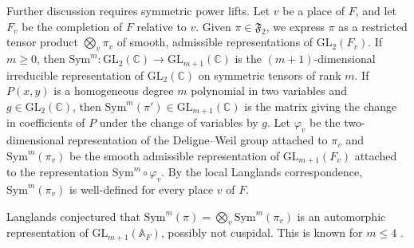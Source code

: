 \documentclass[11pt]{amsart}
\theoremstyle{remark}
\numberwithin{equation}{section}
\begin{document}
Further discussion requires symmetric power lifts.  Let $v$ be a place of $F$, and let $F_v$ be the completion of $F$ relative to $v$.  Given $\pi\in\mathfrak{F}_{2}$, we express $\pi$ as a restricted tensor product $\bigotimes_v\pi_v$ of smooth, admissible representations of $\mathrm{GL}_2(F_v)$.  If $m\geq 0$, then $\mathrm{Sym}^m\colon \mathrm{GL}_2(\mathbb{C})\to\mathrm{GL}_{m+1}(\mathbb{C})$ is the $(m+1)$-dimensional irreducible representation of $\mathrm{GL}_2(\mathbb{C})$ on symmetric tensors of rank $m$.  If $P(x,y)$ is a homogeneous degree $m$ polynomial in two variables and $g\in\mathrm{GL}_2(\mathbb{C})$, then $\mathrm{Sym}^m(\pi')\in\mathrm{GL}_{m+1}(\mathbb{C})$ is the matrix giving the change in coefficients of $P$ under the change of variables by $g$.  Let $\varphi_v$ be the two-dimensional representation of the Deligne--Weil group attached to $\pi_v$ and $\mathrm{Sym}^m(\pi_v)$ be the smooth admissible representation of $\mathrm{GL}_{m+1}(F_v)$ attached to the representation $\mathrm{Sym}^m\circ \varphi_v$.  By the local Langlands correspondence, $\mathrm{Sym}^m(\pi_v)$ is well-defined for every place $v$ of $F$.

Langlands conjectured that $\mathrm{Sym}^m(\pi) = \bigotimes_v \mathrm{Sym}^m(\pi_v)$ is an automorphic representation of $\mathrm{GL}_{m+1}(\mathbb{A}_F)$, possibly not cuspidal.  This is known for $m\leq 4$ \cite{GJ,Kim,KimShahidi}.
\end{document}

